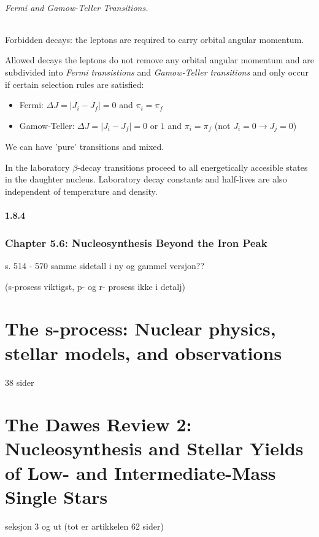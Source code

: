 \documentclass[a4paper,12pt]{article}
\begin{document}
\paragraph{Fermi and Gamow-Teller Transitions.}
Forbidden decays: the leptons are required to carry orbital angular momentum.

Allowed decays the leptons do not remove any orbital angular momentum and are subdivided into \textit{Fermi transistions} and \textit{Gamow-Teller transitions} and only occur if certain selection rules are satisfied:
\begin{itemize}
\item Fermi: $\Delta J = |J_i - J_f| = 0$ and $\pi_i = \pi_f$
\item Gamow-Teller:  $\Delta J = |J_i - J_f| = 0$ or $1$ and $\pi_i = \pi_f$ (not $J_i = 0 \rightarrow J_j = 0$)
\end{itemize}
We can have 'pure' transitions and mixed.

In the laboratory $\beta$-decay transitions proceed to all energetically accesible states in the daughter nucleus. Laboratory decay constants and half-lives are also independent of temperature and density. 



\subsection*{1.8.4}


\section*{Chapter 5.6: Nucleosynthesis Beyond the Iron Peak}
s. 514 -  570 samme sidetall i ny og gammel versjon??

(s-prosess viktigst, p- og r- prosess ikke i detalj)

\part{The s-process: Nuclear physics, stellar models, and observations}
38 sider



\part{The Dawes Review 2: Nucleosynthesis and Stellar Yields of Low- and Intermediate-Mass Single Stars}
seksjon 3 og ut (tot er artikkelen 62 sider)





\end{document}
